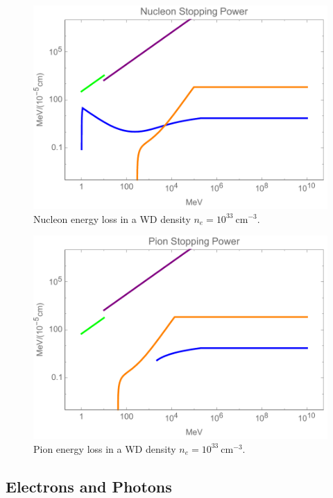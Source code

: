 \documentclass[twocolumn,showpacs,preprintnumbers,amsmath,amssymb,prd]{revtex4}
\begin{document}
\begin{figure}
\includegraphics[scale=.45]{SPnucleon.pdf}
\caption{Nucleon energy loss in a WD density $n_e = 10^{33} ~\text{cm}^{-3}$.}
\label{fig:SPnuc}
\end{figure}

\begin{figure}
\includegraphics[scale=.45]{SPpion.pdf}
\caption{Pion energy loss in a WD density $n_e = 10^{33} ~\text{cm}^{-3}$.}
\label{fig:SPpion}
\end{figure}

\subsection{Electrons and Photons}
\end{document}

